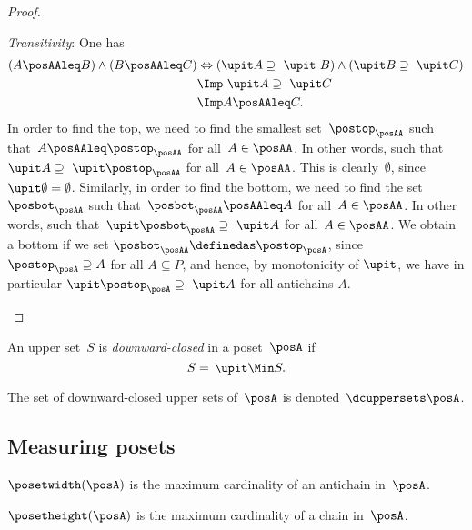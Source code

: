 \begin{proof}
\begin{compactitem}
    \item \emph{Transitivity}: One has
    \begin{equation}
      \begin{aligned}
        \left(A\posAAleq B\right) \wedge \left(B\posAAleq C\right)&\Leftrightarrow  \left(\upit  A \supseteq \ \upit  \ B\right) \wedge \left( \upit   B\supseteq \ \upit  C\right)\\
        &\Imp \ \upit  A\supseteq \ \upit  C\\
        &\Imp A\posAAleq C.
      \end{aligned}
    \end{equation}
    In order to find the top, we need to find the smallest set~$\postop_{\posAA}$ such that~$A\posAAleq \postop_{\posAA}$ for all~$A\in \posAA$. In other words, such that~$\upit  A\supseteq \ \upit  \postop_{\posAA}$ for all~$A\in \posAA$. This is clearly~$\emptyset$, since~$\upit  \emptyset = \emptyset$. Similarly, in order to find the bottom, we need to find the set~$\posbot_{\posAA}$ such that~$\posbot_{\posAA} \posAAleq A$ for all~$A\in \posAA$. In other words, such that~$\upit  \posbot_{\posAA} \supseteq \ \upit  A$ for all~$A\in \posAA$. We obtain a bottom if we set $\posbot_{\posAA} \definedas \postop_{\posA}$, since $\postop_{\posA} \supseteq A$ for all $A \subseteq P$, and hence, by monotonicity of $\upit $, we have in particular $\upit  \postop_{\posA} \supseteq \ \upit  A$ for all antichains $A$.
  \end{compactitem}
\end{proof}



\begin{definition}
  \label{def:downward-closed-upperset}
  An upper set~$S$ is \emph{downward-closed} in a poset~$\posA$ if
  \begin{equation}
    S =\, \upit  \Min S.
  \end{equation}
\end{definition}

The set of downward-closed upper sets of~$\posA$ is denoted~$\dcuppersets \posA$.

\subsection{Measuring posets}
\begin{definition}
  \label{def:poset-width} $\posetwidth(\posA)$ is the maximum
  cardinality of an antichain in~$\posA$.
\end{definition}


\begin{definition}
  \label{def:poset-height} $\posetheight(\posA)$
  is the maximum cardinality of a chain in~$\posA$.
\end{definition}

